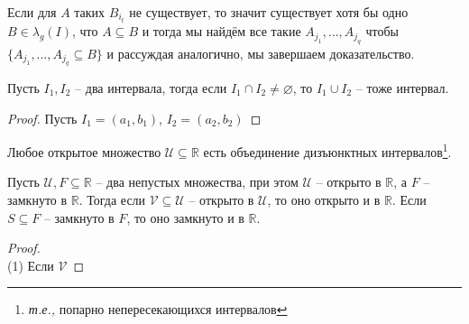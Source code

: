 Если для $A$ таких $B_{i_t}$ не существует, то значит существует хотя бы одно $B \in \lambda_g(I)$, что $A \subseteq B$ и тогда мы найдём все такие $A_{j_1}, \ldots, A_{j_q}$ чтобы $\{A_{j_1}, \ldots, A_{j_q} \subseteq B\}$ и рассуждая аналогично, мы завершаем доказательство. 
















\begin{lemma}
    Пусть $I_1, I_2$ -- два интервала, тогда если $I_1 \cap I_2 \ne \varnothing$, то $I_1 \cup I_2$ -- тоже интервал.
\end{lemma}

\begin{proof}
    Пусть $I_1 =(a_1, b_1)$, $I_2 = (a_2, b_2)$
\end{proof}

\begin{theorem}
    Любое открытое множество $\mathscr{U} \subseteq \mathbb{R}$ есть объединение дизъюнктных интервалов\footnote{\textit{т.е.,} попарно непересекающихся интервалов}.  
\end{theorem}





\begin{theorem}
 Пусть $\mathscr{U},F \subseteq \mathbb{R}$ -- два непустых множества, при этом $\mathscr{U}$ -- открыто в $\mathbb{R}$, а $F$ -- замкнуто в $\mathbb{R}$. Тогда если $\mathscr{V} \subseteq \mathscr{U}$ -- открыто в $\mathscr{U}$, то оно открыто и в $\mathbb{R}$. Если $S\subseteq F$ -- замкнуто в $F$, то оно замкнуто и в $\mathbb{R}$.
\end{theorem}

\begin{proof}~\\
(1) Если $\mathscr{V}$
    
\end{proof}


